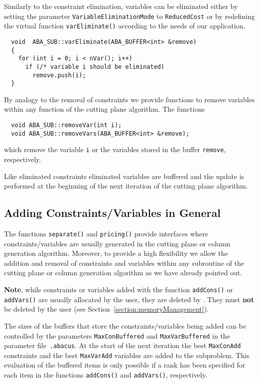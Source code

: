 Similarly to the constraint elimination, variables can be eliminated
either by setting the parameter {\tt VariableEliminationMode}
to {\tt ReducedCost} or by redefining the virtual function {\tt varEliminate()}
according to the needs of our application.
\begin{verbatim}
  void  ABA_SUB::varEliminate(ABA_BUFFER<int> &remove)
  {
    for (int i = 0; i < nVar(); i++)
      if (/* variable i should be eliminated)
        remove.push(i);
  }
\end{verbatim}
By analogy to the removal of constraints we provide functions to
remove variables within any function of the cutting plane algorithm.
The functions
\begin{verbatim}
  void ABA_SUB::removeVar(int i);
  void ABA_SUB::removeVars(ABA_BUFFER<int> &remove);
\end{verbatim}
which remove the variable {\tt i} or the variables stored in the buffer
{\tt remove}, respectively.

Like eliminated constraints eliminated variables are buffered and the
update is performed at the beginning of the next iteration of the cutting
plane algorithm.

\subsection{Adding Constraints/Variables in General}
\label{section:addConVar}

The functions {\tt separate()} and {\tt pricing()}
provide interfaces where constraints/variables
are usually generated in the cutting plane or column generation
algorithm. Moreover, to provide a high flexibility we allow the addition
and removal of constraints and variables within any subroutine of the
cutting plane or column generation algorithm as we have already pointed
out.

{\bf Note}, while constraints or variables
added with the function {\tt addCons()} or {\tt addVars()} are usually
allocated by the user, they are deleted by \ABACUS. They must {\bf
  not} be deleted by the user (see Section~\ref{section:memoryManagement}).

The sizes of the buffers that store the constraints/variables
being added can be controlled by the parameters
{\tt MaxConBuffered}
and {\tt MaxVarBuffered} in the parameter
file~{\tt .abacus}. At the start of the next iteration the
best {\tt MaxConAdd} constraints and the 
best {\tt MaxVarAdd} variables
are added to the subproblem. This evaluation of the buffered items is
only possible if a rank has been specified for each item in the 
functions {\tt addCons()} and {\tt addVars()}, respectively.

